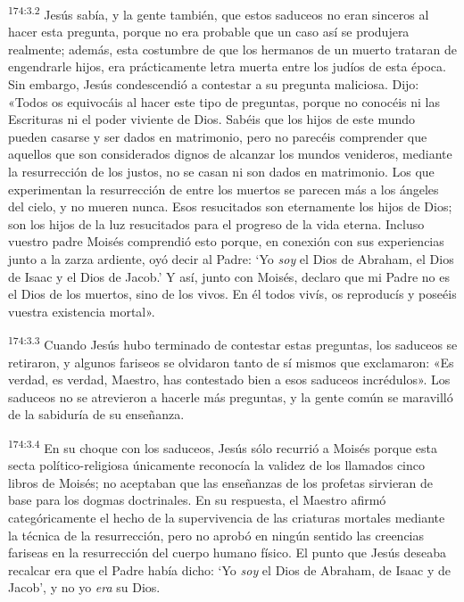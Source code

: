 \par 
\textsuperscript{174:3.2} Jesús sabía, y la gente también, que estos saduceos no eran sinceros al hacer esta pregunta, porque no era probable que un caso así se produjera realmente; además, esta costumbre de que los hermanos de un muerto trataran de engendrarle hijos, era prácticamente letra muerta entre los judíos de esta época. Sin embargo, Jesús condescendió a contestar a su pregunta maliciosa. Dijo: «Todos os equivocáis al hacer este tipo de preguntas, porque no conocéis ni las Escrituras ni el poder viviente de Dios. Sabéis que los hijos de este mundo pueden casarse y ser dados en matrimonio, pero no parecéis comprender que aquellos que son considerados dignos de alcanzar los mundos venideros, mediante la resurrección de los justos, no se casan ni son dados en matrimonio. Los que experimentan la resurrección de entre los muertos se parecen más a los ángeles del cielo, y no mueren nunca. Esos resucitados son eternamente los hijos de Dios; son los hijos de la luz resucitados para el progreso de la vida eterna. Incluso vuestro padre Moisés comprendió esto porque, en conexión con sus experiencias junto a la zarza ardiente, oyó decir al Padre:
`Yo \textit{soy} el Dios de Abraham, el Dios de Isaac y el Dios de Jacob.' Y así, junto con Moisés, declaro que mi Padre no es el Dios de los muertos, sino de los vivos. En él todos vivís, os reproducís y poseéis vuestra existencia mortal».

\par 
\textsuperscript{174:3.3} Cuando Jesús hubo terminado de contestar estas preguntas, los saduceos se retiraron, y algunos fariseos se olvidaron tanto de sí mismos que exclamaron: «Es verdad, es verdad, Maestro, has contestado bien a esos saduceos incrédulos». Los saduceos no se atrevieron a hacerle más preguntas, y la gente común se maravilló de la sabiduría de su enseñanza.

\par 
\textsuperscript{174:3.4} En su choque con los saduceos, Jesús sólo recurrió a Moisés porque esta secta político-religiosa únicamente reconocía la validez de los llamados cinco libros de Moisés; no aceptaban que las enseñanzas de los profetas sirvieran de base para los dogmas doctrinales. En su respuesta, el Maestro afirmó categóricamente el hecho de la supervivencia de las criaturas mortales mediante la técnica de la resurrección, pero no aprobó en ningún sentido las creencias fariseas en la resurrección del cuerpo humano físico. El punto que Jesús deseaba recalcar era que el Padre había dicho:
`Yo \textit{soy} el Dios de Abraham, de Isaac y de Jacob', y no yo \textit{era} su Dios.

